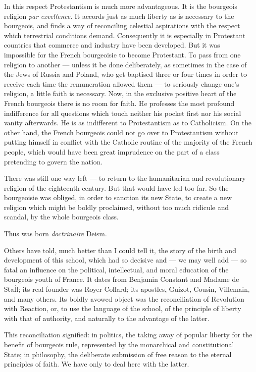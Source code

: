 \documentclass[12pt]{report}
\begin{document}
In this respect Protestantism is much more advantageous. It is the bourgeois religion \emph{par excellence}. It accords just as much liberty as is necessary to the bourgeois, and finds a way of reconciling celestial aspirations with the respect which terrestrial conditions demand. Consequently it is especially in Protestant countries that commerce and industry have been developed. But it was impossible for the French bourgeoisie to become Protestant. To pass from one religion to another — unless it be done deliberately, as sometimes in the case of the Jews of Russia and Poland, who get baptised three or four times in order to receive each time the remuneration allowed them — to seriously change one’s religion, a little faith is necessary. Now, in the exclusive positive heart of the French bourgeois there is no room for faith. He professes the most profound indifference for all questions which touch neither his pocket first nor his social vanity afterwards. He is as indifferent to Protestantism as to Catholicism. On the other hand, the French bourgeois could not go over to Protestantism without putting himself in conflict with the Catholic routine of the majority of the French people, which would have been great imprudence on the part of a class pretending to govern the nation.


There was still one way left — to return to the humanitarian and revolutionary religion of the eighteenth century. But that would have led too far. So the bourgeoisie was obliged, in order to sanction its new State, to create a new religion which might be boldly proclaimed, without too much ridicule and scandal, by the whole bourgeois class.


Thus was born \emph{doctrinaire} Deism.


Others have told, much better than I could tell it, the story of the birth and development of this school, which had so decisive and — we may well add — so fatal an influence on the political, intellectual, and moral education of the bourgeois youth of France. It dates from Benjamin Constant and Madame de StaÎl; its real founder was Royer-Collard; its apostles, Guizot, Cousin, Villemain, and many others. Its boldly avowed object was the reconciliation of Revolution with Reaction, or, to use the language of the school, of the principle of liberty with that of authority, and naturally to the advantage of the latter.


This reconciliation signified: in politics, the taking away of popular liberty for the benefit of bourgeois rule, represented by the monarchical and constitutional State; in philosophy, the deliberate submission of free reason to the eternal principles of faith. We have only to deal here with the latter.
\end{document}
